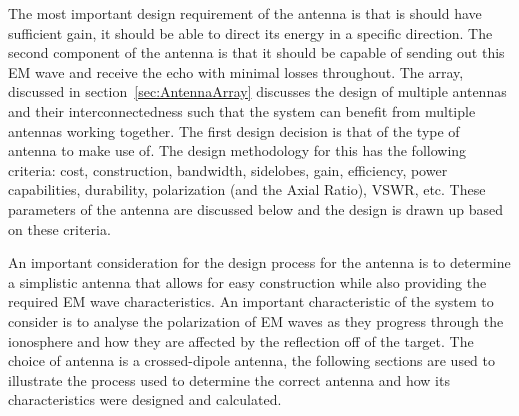 \documentclass[11pt]{witseiepaper}
\begin{document}
\begin{bibunit}[witseie]
The most important design requirement of the antenna is that is should have sufficient gain, it should be able to direct its energy in a specific direction. The second component of the antenna is that it should be capable of sending out this EM wave and receive the echo with minimal losses throughout. %
The array, discussed in section~\ref{sec:AntennaArray} discusses the design of multiple antennas and their interconnectedness such that the system can benefit from multiple antennas working together.
The first design decision is that of the type of antenna to make use of. The design methodology for this has the following criteria: cost, construction, bandwidth, sidelobes, gain, efficiency, power capabilities, durability, polarization (and the Axial Ratio), VSWR, etc. 
These parameters of the antenna are discussed below and the design is drawn up based on these criteria.

An important consideration for the design process for the antenna is to determine a simplistic antenna that allows for easy construction while also providing the required EM wave characteristics.
An important characteristic of the system to consider is to analyse the polarization of EM waves as they progress through the ionosphere and how they are affected by the reflection off of the target.
The choice of antenna is a crossed-dipole antenna, the following sections are used to illustrate the process used to determine the correct antenna and how its characteristics were designed and calculated.


\end{bibunit}
\end{document}
